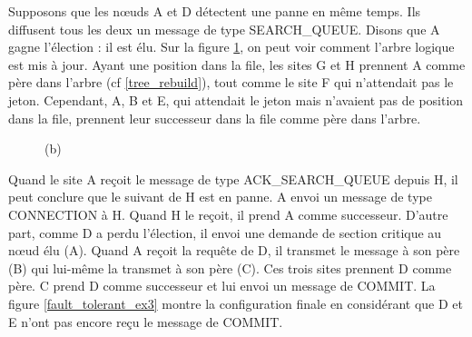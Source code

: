 Supposons que les nœuds A et D détectent une panne en même temps. Ils diffusent tous les deux un message de type SEARCH\_QUEUE. Disons que A gagne l'élection : il est élu. Sur la figure \ref{fault_tolerant_ex2}, on peut voir comment l'arbre logique est mis à jour. Ayant une position dans la file, les sites G et H prennent A comme père dans l'arbre (cf \ref{tree_rebuild}), tout comme le site F qui n'attendait pas le jeton. Cependant, A, B et E, qui attendait le jeton mais n'avaient pas de position dans la file, prennent leur successeur dans la file comme père dans l'arbre.

\begin{figure}[H]
\centering
	\hspace{1cm}
	\caption{(b)\label{fault_tolerant_ex2}}
\end{figure}

Quand le site A reçoit le message de type ACK\_SEARCH\_QUEUE depuis H, il peut conclure que le suivant de H est en panne. A envoi un message de type CONNECTION à H. Quand H le reçoit, il prend A comme successeur. D'autre part, comme D a perdu l'élection, il envoi une demande de section critique au nœud élu (A). Quand A reçoit la requête de D, il transmet le message à son père (B) qui lui-même la transmet à son père (C). Ces trois sites prennent D comme père. C prend D comme successeur et lui envoi un message de COMMIT. La figure \ref{fault_tolerant_ex3} montre la configuration finale en considérant que D et E n'ont pas encore reçu le message de COMMIT.

